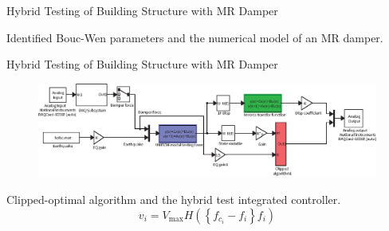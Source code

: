 \documentclass[usepdftitle=false]{beamer}
\begin{document}
\begin{frame}{Hybrid Testing of Building Structure with MR Damper}
\begin{figure}[H]
\centering
\setcounter{subfigure}{0}
\label{fig:8-13}
\end{figure}
Identified Bouc-Wen parameters and the numerical model of an MR damper.
\end{frame}



\begin{frame}{Hybrid Testing of Building Structure with MR Damper}
\begin{figure}[H]
\centering
\includegraphics[width=1\textwidth] {figure/8-14.eps}
\label{fig:8-14}
\end{figure}
Clipped-optimal algorithm and the hybrid test integrated controller.
\begin{equation}\label{eq:8-21}
v_{i} = V_{\text{max}}H\left(\left\{f_{c_{i}}-f_{i}\right\}f_{i}\right)
\end{equation}
\end{frame}
\end{document}
